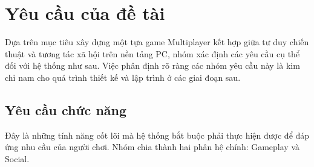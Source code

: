 \section{Yêu cầu của đề tài}
Dựa trên mục tiêu xây dựng một tựa game Multiplayer kết hợp giữa tư duy chiến thuật và tương tác xã hội trên nền tảng PC, nhóm xác định các yêu cầu cụ thể đối với hệ thống như sau. Việc phân định rõ ràng các nhóm yêu cầu này là kim chỉ nam cho quá trình thiết kế và lập trình ở các giai đoạn sau.
\subsection{Yêu cầu chức năng}
Đây là những tính năng cốt lõi mà hệ thống bắt buộc phải thực hiện được để đáp ứng nhu cầu của người chơi. Nhóm chia thành hai phân hệ chính: Gameplay và Social.

